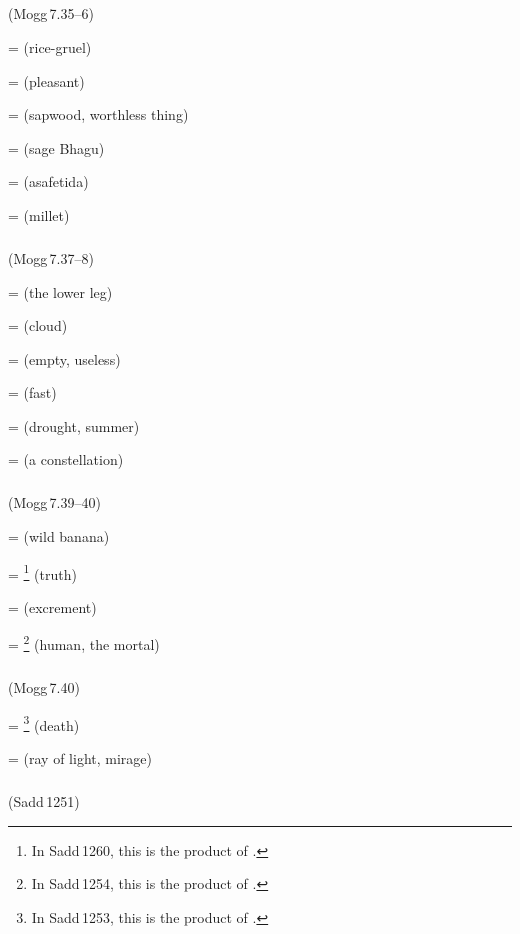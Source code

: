 \subparagraph*{} (Mogg\,7.35--6)\label{pacckx:gu}

 =  (rice-gruel)\par
{} =  (pleasant)\par
{} =  (sapwood, worthless thing)\par
{} =  (sage Bhagu)\par
{} =  (asafetida)\par
{} =  (millet)\par

\subparagraph*{} (Mogg\,7.37--8)\label{pacckx:gha}

 =  (the lower leg)\par
{} =  (cloud)\par
{} =  (empty, useless)\par
{} =  (fast)\par
{} =  (drought, summer)\par
{} =  (a constellation)\par

\subparagraph*{} (Mogg\,7.39--40)\label{pacckx:ca}

 =  (wild banana)\par
{} = \footnote{In Sadd\,1260, this is the product of .} (truth)\par
{} =  (excrement)\par
{} = \footnote{In Sadd\,1254, this is the product of .} (human, the mortal)\par

\subparagraph*{} (Mogg\,7.40)\label{pacckx:cu}\label{pacckx:iici}

 = \footnote{In Sadd\,1253, this is the product of .} (death)\par
{} =  (ray of light, mirage)\par

\subparagraph*{} (Sadd\,1251)\label{pacckx:ccha}\label{pacckx:cchaana}

